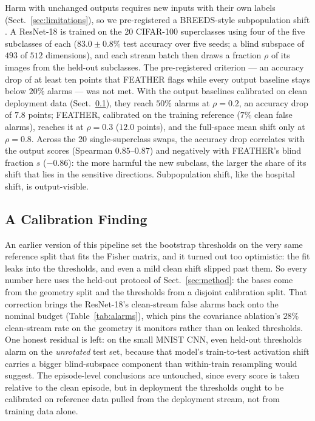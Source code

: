 \documentclass[graybox]{SNmult}
\begin{document}
Harm with unchanged outputs requires new inputs with their own labels
(Sect.~\ref{sec:limitations}), so we pre-registered a BREEDS-style subpopulation
shift \cite{santurkar2021breeds}. A ResNet-18 is trained on the 20 CIFAR-100
superclasses using four of the five subclasses of each ($83.0 \pm 0.8\%$ test
accuracy over five seeds; a blind subspace of $493$ of $512$ dimensions), and
each stream batch then draws a fraction $\rho$ of its images from the held-out
subclasses. The pre-registered criterion --- an accuracy drop of at least ten
points that FEATHER flags while every output baseline stays below $20\%$ alarms
--- was not met. With the output baselines calibrated on clean deployment data
(Sect.~\ref{sec:calibration}), they reach $50\%$ alarms at $\rho = 0.2$, an
accuracy drop of $7.8$ points; FEATHER, calibrated on the training reference
($7\%$ clean false alarms), reaches it at $\rho = 0.3$ ($12.0$ points), and the
full-space mean shift only at $\rho = 0.8$. Across the 20 single-superclass
swaps, the accuracy drop correlates with the output scores (Spearman
$0.85$--$0.87$) and negatively with FEATHER's blind fraction $s$ ($-0.86$): the
more harmful the new subclass, the larger the share of its shift that lies in
the sensitive directions. Subpopulation shift, like the hospital shift, is
output-visible.

\subsection{A Calibration Finding}
\label{sec:calibration}

An earlier version of this pipeline set the bootstrap thresholds on the very
same reference split that fits the Fisher matrix, and it turned out too
optimistic: the fit leaks into the thresholds, and even a mild clean shift
slipped past them. So every number here uses the held-out protocol of
Sect.~\ref{sec:method}: the bases come from the geometry split and the
thresholds from a disjoint calibration split. That correction brings the
ResNet-18's clean-stream false alarms back onto the nominal budget
(Table~\ref{tab:alarms}), which pins the covariance ablation's $28\%$
clean-stream rate on the geometry it monitors rather than on leaked
thresholds. One honest residual is left: on the small MNIST CNN, even
held-out thresholds alarm on the \emph{unrotated} test set, because that
model's train-to-test activation shift carries a bigger blind-subspace
component than within-train resampling would suggest. The episode-level
conclusions are untouched, since every score is taken relative to the clean
episode, but in deployment the thresholds ought to be calibrated on reference
data pulled from the deployment stream, not from training data alone.
\end{document}
